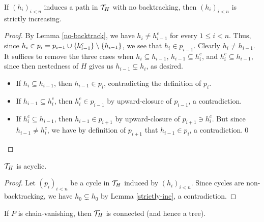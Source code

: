 \documentclass{amsart}
\begin{document}
    \begin{lemma}\label{strictly-inc}
        If $(h_i)_{i<n}$ induces a path in $\mathcal{T}_H$ with no backtracking, then $(h_i)_{i<n}$ is strictly increasing.
    \end{lemma}
    \begin{proof}
        By Lemma \ref{no-backtrack}, we have $h_i\neq h_{i-1}^c$ for every $1\leq i<n$. Thus, since $h_i\in p_i=p_{i-1}\cup\{h_{i-1}^c\}\setminus\left\{h_{i-1}\right\}$, we see that $h_i\in p_{i-1}$. Clearly $h_i\neq h_{i-1}$. It suffices to remove the three cases when $h_i\subseteq h_{i-1}$, $h_{i-1}\subseteq h_i^c$, and $h_i^c\subseteq h_{i-1}$, since then nestedness of $H$ gives us $h_{i-1}\subsetneq h_i$, as desired.
        \begin{itemize}
            \item If $h_i\subseteq h_{i-1}$, then $h_{i-1}\in p_i$, contradicting the definition of $p_i$.
            \item If $h_{i-1}\subseteq h_i^c$, then $h_i^c\in p_{i-1}$ by upward-closure of $p_{i-1}$, a contradiction.
            \item If $h_i^c\subseteq h_{i-1}$, then $h_{i-1}\in p_{i+1}$ by upward-closure of $p_{i+1}\ni h_i^c$. But since $h_{i-1}\neq h_i^c$, we have by definition of $p_{i+1}$ that $h_{i-1}\in p_i$, a contradiction.\qed
        \end{itemize}
    \end{proof}

    \begin{proposition}\label{acyclic}
        $\mathcal{T}_H$ is acyclic.
    \end{proposition}
    \begin{proof}
        Let $(p_i)_{i<n}$ be a cycle in $\mathcal{T}_H$ induced by $(h_i)_{i<n}$. Since cycles are non-backtracking, we have $h_0\subsetneq h_0$ by Lemma \ref{strictly-inc}, a contradiction.
    \end{proof}

    \begin{proposition}\label{tree-fs}
        If $P$ is chain-vanishing, then $\mathcal{T}_H$ is connected (and hence a tree).
    \end{proposition}

    \begin{proposition}\label{tree-cv}
        
    \end{proposition}

    {}
\end{document}
